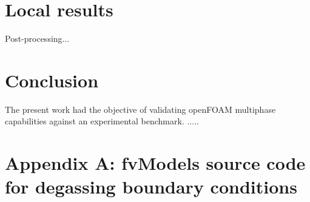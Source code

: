 \documentclass[11pt,a4paper]{article}
\begin{document}
\section{Local results}
\label{sec:localresults}

Post-processing...



\section{Conclusion}
\label{sec:Conclusion}

The present work had the objective of validating openFOAM multiphase capabilities against  an experimental benchmark.  .....











\clearpage


\appendix
\section{Appendix A: fvModels source code for degassing boundary conditions}
\label{app:A}



\cleardoublepage
\end{document}
